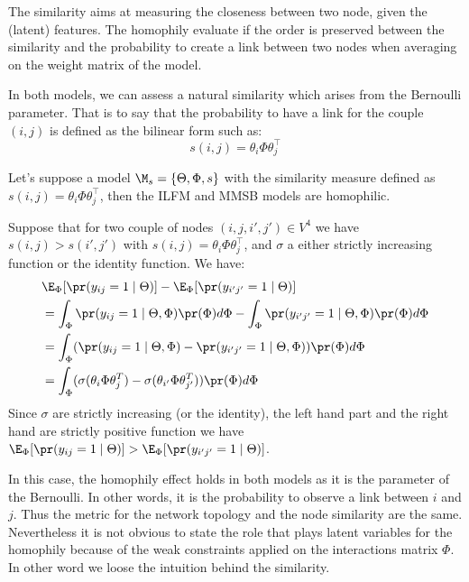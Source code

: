 The similarity aims at measuring the closeness between two node, given the (latent) features. The homophily evaluate if the order is preserved between the similarity and the probability to create a link between two nodes when averaging on the weight matrix of the model.

In both models, we can assess a natural similarity which arises from the Bernoulli parameter. That is to say that the probability to have a link for the couple $(i,j)$ is defined as the bilinear form such as: 
\begin{equation}
s(i,j) = \theta_i \Phi \theta_j^\top
\end{equation}

\begin{proposition}[]
Let's suppose a model $ \M_s=\{\Theta, \Phi, s\}$ with the similarity measure defined as $s(i,j) = \theta_i \Phi \theta_j^\top$, then the ILFM and MMSB models are homophilic.
\end{proposition}

\begin{IEEEproof}
Suppose that for two couple of nodes $(i,j,i',j') \in V^4$ we have $s(i,j) > s(i',j')$ with $s(i,j) =\theta_i \Phi \theta_j^\top$, and $\sigma$ a either strictly increasing function or the identity function. We have:
\begin{align}
&\E_\Phi[\pr(y_{ij}=1 \mid \Theta)] - \E_\Phi[\pr(y_{i'j'} = 1  \mid \Theta)] \\
&= \int_{\Phi} \pr(y_{ij}=1 \mid \Theta, \Phi ) \pr(\Phi) d\Phi - \int_{\Phi}\pr(y_{i'j'}=1 \mid \Theta, \Phi ) \pr(\Phi) d\Phi \\
&= \int_\Phi ( \pr(y_{ij}=1 \mid \Theta, \Phi )  - \pr(y_{i'j'}=1 \mid \Theta, \Phi ) )\pr(\Phi) d\Phi \\
&=  \int_\Phi ( \sigma(\theta_i \Phi  \theta_j^T) -\sigma(\theta_{i'} \Phi  \theta_{j'}^T) )\pr(\Phi) d\Phi
\end{align}
Since $\sigma$ are strictly increasing (or the identity), the left hand part and the right hand are strictly positive function we have $\E_\Phi[\pr(y_{ij}=1 \mid \Theta)] > \E_\Phi[\pr(y_{i'j'} = 1  \mid \Theta)]$.~\\
\end{IEEEproof}

In this case, the homophily effect holds in both models as it is the parameter of the Bernoulli. In other words, it is the probability to observe a link between $i$ and $j$. Thus the metric for the network topology and the node similarity are the same. Nevertheless it is not obvious to state the role that plays latent variables for the homophily because of the weak constraints applied on the interactions matrix $\Phi$. In other word we loose the intuition behind the similarity. ~\\

